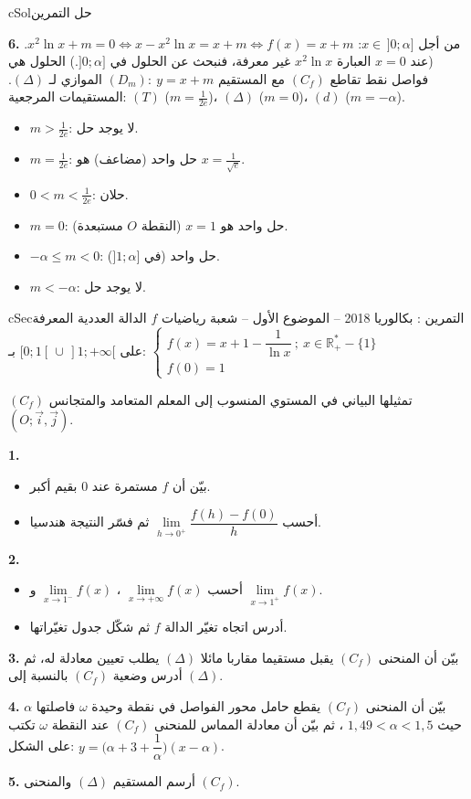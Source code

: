 \documentclass[12pt,a4paper]{article}
\newenvironment{BOX}[2]{\begin{otherlanguage}{english}\begin{arbox}{#1}{#2}}{\end{arbox}\end{otherlanguage}}
\newcounter{exo}
\newenvironment{tamrin}[1]{\stepcounter{exo}\begin{BOX}{cSec}{التمرين \theexo: #1}}{\end{BOX}}
\newenvironment{hal}{\Needspace{12\baselineskip}\begin{otherlanguage}{english}\begin{arbox}[breakable]{cSol}{حل التمرين \theexo}}{\end{arbox}\end{otherlanguage}}
\newcommand{\R}{\mathbb{R}}
\newenvironment{sq}{\begin{itemize}[leftmargin=2.4em,itemsep=3pt]}{\end{itemize}}
\newcommand{\qa}{\item[(أ)]}\newcommand{\qb}{\item[(ب)]}\newcommand{\qc}{\item[(جـ)]}\newcommand{\qd}{\item[(د)]}\newcommand{\qe}{\item[(هـ)]}
\newcommand{\QQ}[1]{\par\smallskip\textbf{#1.} }
\begin{document}
\begin{hal}
\QQ{6} من أجل $x\in\,]0;\alpha]$: $x^2\ln x+m=0\iff x-x^2\ln x=x+m\iff f(x)=x+m$.
(عند $x=0$ العبارة $x^2\ln x$ غير معرفة، فنبحث عن الحلول في $]0;\alpha]$.)
الحلول هي فواصل نقط تقاطع $(C_f)$ مع المستقيم $(D_m):\ y=x+m$ الموازي لـ $(\Delta)$. المستقيمات المرجعية: $(T)$ ($m=\frac{1}{2e}$)، $(\Delta)$ ($m=0$)، $(d)$ ($m=-\alpha$).
\begin{itemize}
\item $m>\frac{1}{2e}$: لا يوجد حل.
\item $m=\frac{1}{2e}$: حل واحد (مضاعف) هو $x=\frac{1}{\sqrt e}$.
\item $0<m<\frac{1}{2e}$: حلان.
\item $m=0$: حل واحد هو $x=1$ (النقطة $O$ مستبعدة).
\item $-\alpha\leq m<0$: حل واحد (في $]1;\alpha]$).
\item $m<-\alpha$: لا يوجد حل.
\end{itemize}
\end{hal}

\begin{tamrin}{بكالوريا 2018 -- الموضوع الأول -- شعبة رياضيات}
$f$ الدالة العددية المعرفة على $[0;1[\,\cup\,]1;+\infty[$ بـ:
$\begin{cases} f(x)=x+1-\dfrac{1}{\ln x}\ ;\ x\in\R_+^{*}-\{1\}\\[4pt] f(0)=1\end{cases}$

$(C_f)$ تمثيلها البياني في المستوي المنسوب إلى المعلم المتعامد والمتجانس $(O;\vec i,\vec j)$.
\QQ{1}
\begin{sq}
\qa بيّن أن $f$ مستمرة عند $0$ بقيم أكبر.
\qb أحسب $\lim\limits_{h\to0^{+}}\dfrac{f(h)-f(0)}{h}$ ثم فسّر النتيجة هندسيا.
\end{sq}
\QQ{2}
\begin{sq}
\qa أحسب $\lim\limits_{x\to+\infty}f(x)$ ، $\lim\limits_{x\to1^{-}}f(x)$ و $\lim\limits_{x\to1^{+}}f(x)$.
\qb أدرس اتجاه تغيّر الدالة $f$ ثم شكّل جدول تغيّراتها.
\end{sq}
\QQ{3} بيّن أن المنحنى $(C_f)$ يقبل مستقيما مقاربا مائلا $(\Delta)$ يطلب تعيين معادلة له، ثم أدرس وضعية $(C_f)$ بالنسبة إلى $(\Delta)$.
\QQ{4} بيّن أن المنحنى $(C_f)$ يقطع حامل محور الفواصل في نقطة وحيدة $\omega$ فاصلتها $\alpha$ حيث $1{,}49<\alpha<1{,}5$ ، ثم بيّن أن معادلة المماس للمنحنى $(C_f)$ عند النقطة $\omega$ تكتب على الشكل: $y=\Big(\alpha+3+\dfrac1\alpha\Big)(x-\alpha)$.
\QQ{5} أرسم المستقيم $(\Delta)$ والمنحنى $(C_f)$.
\end{tamrin}
\end{document}

